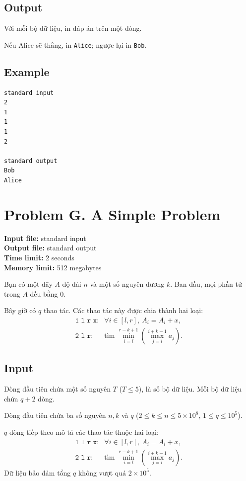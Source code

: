 \documentclass[11pt]{article}
\begin{document}
\subsection*{Output}

Với mỗi bộ dữ liệu, in đáp án trên một dòng.

Nếu Alice sẽ thắng, in \texttt{Alice}; ngược lại in \texttt{Bob}.

\subsection*{Example}

\begin{verbatim}
standard input
2
1
1
1
2

standard output
Bob
Alice
\end{verbatim}

\section{Problem G. A Simple Problem}

\noindent
\textbf{Input file:} standard input\\
\textbf{Output file:} standard output\\
\textbf{Time limit:} 2 seconds\\
\textbf{Memory limit:} 512 megabytes

Bạn có một dãy $A$ độ dài $n$ và một số nguyên dương $k$. Ban đầu, mọi phần tử
trong $A$ đều bằng $0$.

Bây giờ có $q$ thao tác. Các thao tác này được chia thành hai loại:
\[
\begin{array}{ll}
\texttt{1 l r x}: & \forall i\in [l,r],\ A_i=A_i+x,\\[0.2em]
\texttt{2 l r}: & \text{tìm }\displaystyle
  \min_{i=l}^{r-k+1}\left(\max_{j=i}^{i+k-1} a_j\right).
\end{array}
\]

\subsection*{Input}

Dòng đầu tiên chứa một số nguyên $T$ ($T\le 5$), là số bộ dữ liệu. Mỗi bộ dữ
liệu chứa $q+2$ dòng.

Dòng đầu tiên chứa ba số nguyên $n,k$ và $q$
($2\le k\le n\le 5\times 10^8$, $1\le q\le 10^5$).

$q$ dòng tiếp theo mô tả các thao tác thuộc hai loại:
\[
\begin{array}{ll}
\texttt{1 l r x}: & \forall i\in [l,r],\ A_i=A_i+x,\\[0.2em]
\texttt{2 l r}: & \text{tìm }\displaystyle
  \min_{i=l}^{r-k+1}\left(\max_{j=i}^{i+k-1} a_j\right).
\end{array}
\]
Dữ liệu bảo đảm tổng $q$ không vượt quá $2\times 10^5$.
\end{document}
